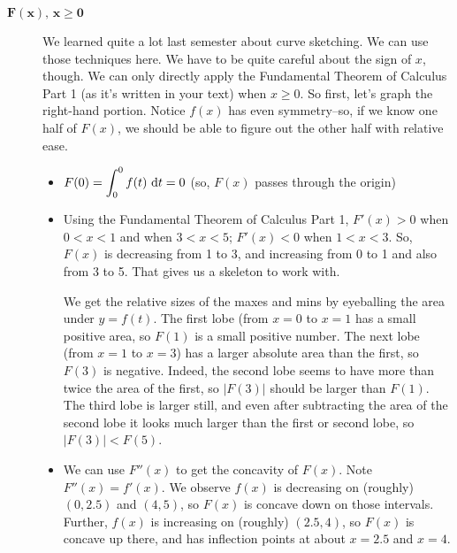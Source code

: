 \begin{solution}
\begin{description}
\item[$\mathbf{F(x),\,x \ge 0}$]
We learned quite a lot last semester about curve sketching. We can use those techniques here. We have to be quite careful about the sign of $x$, though. We can only directly apply the Fundamental Theorem of Calculus Part 1 (as it's written in your text) when $x\ge 0$. So first, let's graph the right-hand portion. Notice $f(x)$ has even symmetry--so, if we know one half of $F(x)$, we should be able to figure out the other half with relative ease.

\begin{itemize}
\item $F(0)=\displaystyle\int_0^0 f(t)\ \dee{t}=0$ (so, $F(x)$ passes through the origin)
\item Using the Fundamental Theorem of Calculus Part 1, $F'(x)>0$ when $0<x<1$ and when $3<x<5$; $F'(x)<0$ when $1<x<3$. So, $F(x)$ is decreasing from 1 to 3, and increasing from 0 to 1 and also from 3 to 5. That gives us a skeleton to work with.
\begin{center}
\end{center}
We get the relative sizes of the maxes and mins by eyeballing the area under $y=f(t)$. The first lobe (from $x=0$ to $x=1$ has a small positive area, so $F(1)$ is a small positive number. The next lobe (from $x=1$ to $x=3$) has a larger absolute area than the first, so $F(3)$ is negative. Indeed, the second lobe seems to have more than twice the area of the first, so $|F(3)|$ should be larger than $F(1)$. The third lobe is larger still, and even after subtracting the area of the second lobe it looks much larger than the first or second lobe, so $|F(3)|<F(5)$.
\item We can use $F''(x)$ to get the concavity of $F(x)$. Note $F''(x)=f'(x)$. We observe $f(x)$ is decreasing on (roughly) $(0,2.5)$ and $(4,5)$, so $F(x)$ is concave down on those intervals.
Further, $f(x)$ is increasing on (roughly) $(2.5,4)$, so $F(x)$ is concave up there, and has inflection points at about $x=2.5$ and $x=4$.


\begin{center}
\end{center}


\end{itemize}
\end{description}
\end{solution}
